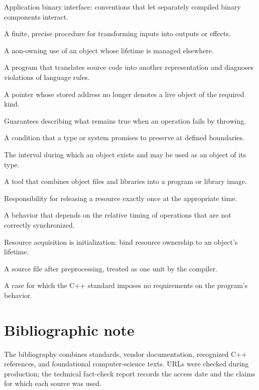 \begin{description}[style=nextline,leftmargin=2.6cm,labelindent=0pt]
\item[ABI] Application binary interface: conventions that let separately compiled binary components interact.
\item[Algorithm] A finite, precise procedure for transforming inputs into outputs or effects.
\item[Borrow] A non-owning use of an object whose lifetime is managed elsewhere.
\item[Compiler] A program that translates source code into another representation and diagnoses violations of language rules.
\item[Dangling pointer] A pointer whose stored address no longer denotes a live object of the required kind.
\item[Exception safety] Guarantees describing what remains true when an operation fails by throwing.
\item[Invariant] A condition that a type or system promises to preserve at defined boundaries.
\item[Lifetime] The interval during which an object exists and may be used as an object of its type.
\item[Linker] A tool that combines object files and libraries into a program or library image.
\item[Ownership] Responsibility for releasing a resource exactly once at the appropriate time.
\item[Race condition] A behavior that depends on the relative timing of operations that are not correctly synchronized.
\item[RAII] Resource acquisition is initialization: bind resource ownership to an object's lifetime.
\item[Translation unit] A source file after preprocessing, treated as one unit by the compiler.
\item[Undefined behavior] A case for which the C++ standard imposes no requirements on the program's behavior.
\end{description}

\chapter*{Bibliographic note}

The bibliography combines standards, vendor documentation, recognized C++ references, and foundational computer-science texts. URLs were checked during production; the technical fact-check report records the access date and the claims for which each source was used.


\nocite{*}

